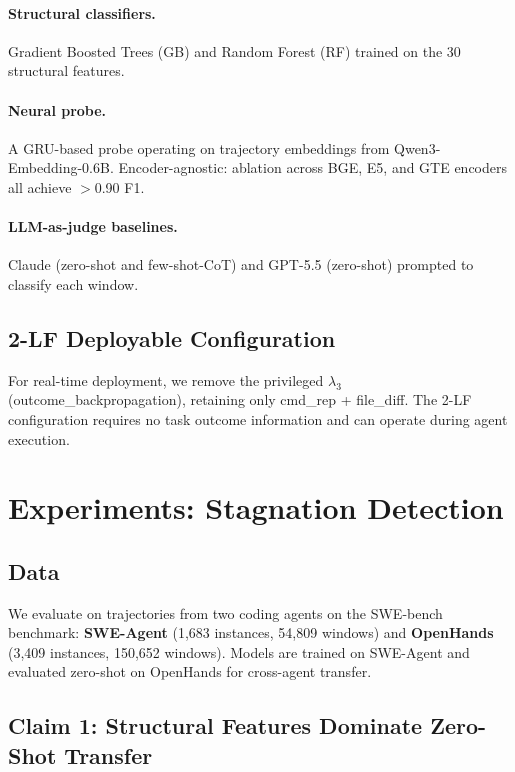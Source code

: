\documentclass[11pt,a4paper]{article}
\begin{document}
\paragraph{Structural classifiers.} Gradient Boosted Trees (GB) and Random Forest (RF) trained on the 30 structural features.

\paragraph{Neural probe.} A GRU-based probe operating on trajectory embeddings from Qwen3-Embedding-0.6B. Encoder-agnostic: ablation across BGE, E5, and GTE encoders all achieve $>$0.90 F1.

\paragraph{LLM-as-judge baselines.} Claude (zero-shot and few-shot-CoT) and GPT-5.5 (zero-shot) prompted to classify each window.

\subsection{2-LF Deployable Configuration}

For real-time deployment, we remove the privileged $\lambda_3$ (outcome\_backpropagation), retaining only cmd\_rep + file\_diff. The 2-LF configuration requires no task outcome information and can operate during agent execution.

\section{Experiments: Stagnation Detection}
\label{sec:experiments}

\subsection{Data}

We evaluate on trajectories from two coding agents on the SWE-bench benchmark:
\textbf{SWE-Agent} (1,683 instances, 54,809 windows) and
\textbf{OpenHands} (3,409 instances, 150,652 windows).
Models are trained on SWE-Agent and evaluated zero-shot on OpenHands for cross-agent transfer.

\subsection{Claim 1: Structural Features Dominate Zero-Shot Transfer}
\label{sec:claim1}
\end{document}
